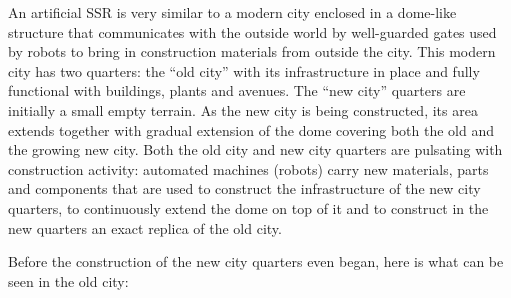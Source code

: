An artificial SSR is very similar to a modern city enclosed in a
dome-like structure that communicates with the outside world by
well-guarded gates used by robots to bring in construction materials
from outside the city. This modern city has two quarters: the “old
city” with its infrastructure in place and fully functional with
buildings, plants and avenues. The “new city” quarters are initially a
small empty terrain. As the new city is being constructed, its area
extends together with gradual extension of the dome covering both the
old and the growing new city. Both the old city and new city quarters
are pulsating with construction activity: automated machines (robots)
carry new materials, parts and components that are used to construct
the infrastructure of the new city quarters, to continuously extend the
dome on top of it and to construct in the new quarters an exact replica
of the old city.


\bigskip

Before the construction of the new city quarters even began, here is
what can be seen in the old city:


\bigskip

